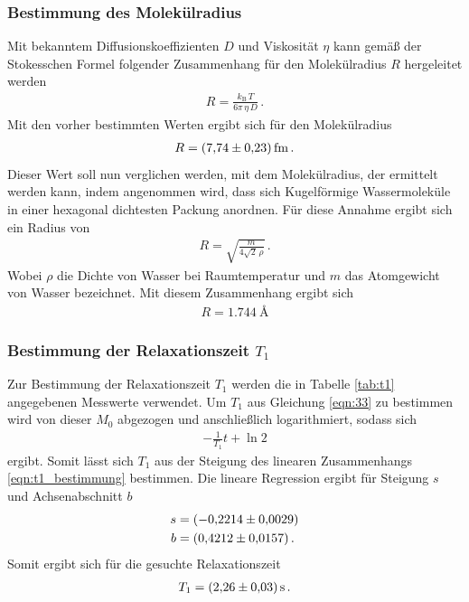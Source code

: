 \FloatBarrier
\subsubsection{Bestimmung des Molekülradius}
\label{subsubsec:molekuelradius}
Mit bekanntem Diffusionskoeffizienten $D$ und Viskosität $\eta$ kann gemäß
der Stokesschen Formel folgender Zusammenhang für den Molekülradius $R$ hergeleitet werden
\begin{align}
  \label{eqn:stokes}
  R = \frac{k_\text{B} \, T}{6 \pi \, \eta \, D} \, .
\end{align}
Mit den vorher bestimmten Werten ergibt sich für den Molekülradius
\begin{align*}
  R = \SI{7.74+-0.23}{\femto\meter} \, .
\end{align*}
Dieser Wert soll nun verglichen werden, mit dem Molekülradius, der ermittelt werden kann, indem angenommen wird, dass sich
Kugelförmige Wassermoleküle in einer hexagonal dichtesten Packung anordnen.
Für diese Annahme ergibt sich ein Radius von
\begin{align*}
  R = \sqrt{\frac{m}{4\sqrt{2} \, \rho}} \, .
\end{align*}
Wobei $\rho$ die Dichte von Wasser bei Raumtemperatur und $m$ das Atomgewicht von Wasser bezeichnet.
Mit diesem Zusammenhang ergibt sich
\begin{align*}
  R = \SI{1.744}{\angstrom}
\end{align*}
\subsubsection{Bestimmung der Relaxationszeit $T_{1}$}
\label{subsubsec:T1}
Zur Bestimmung der Relaxationszeit $T_{1}$ werden die in Tabelle \ref{tab:t1} angegebenen
Messwerte verwendet. Um $T_{1}$ aus Gleichung \eqref{eqn:33} zu bestimmen wird von dieser $M_{0}$ abgezogen und anschließlich logarithmiert, sodass sich
\begin{align}
  \label{eqn:t1_bestimmung}
  -\frac{1}{T_{1}} t + \ln 2
\end{align}
ergibt.
Somit lässt sich $T_{1}$ aus der Steigung des linearen Zusammenhangs \eqref{eqn:t1_bestimmung} bestimmen.
Die lineare Regression ergibt für Steigung $s$ und Achsenabschnitt $b$
\begin{align*}
  s &= \SI{-0.2214+-0.0029}{}\\
  b &= \SI{0.4212+-0.0157}{} \, .
\end{align*}
Somit ergibt sich für die gesuchte Relaxationszeit
\begin{align*}
  T_{1} = \SI{2.26+-0.03}{\second} \, .
\end{align*}


